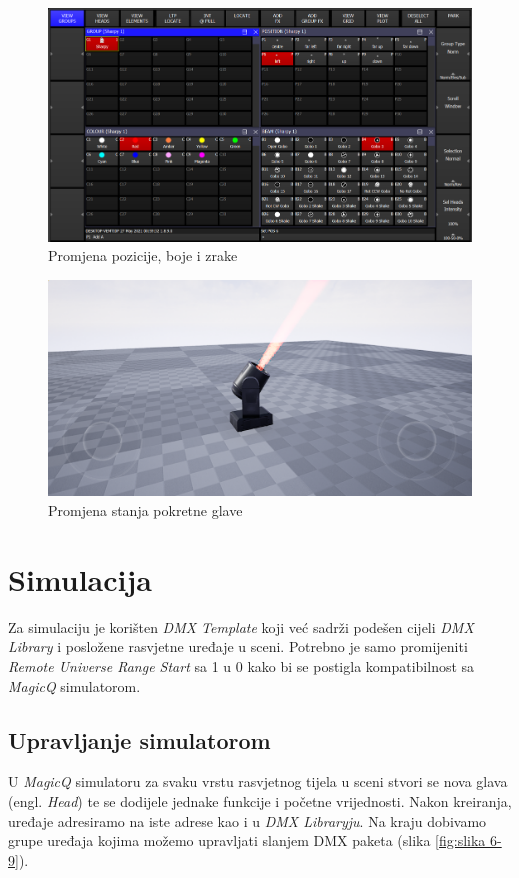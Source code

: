 \documentclass[times, utf8, zavrsni, numeric]{fer}
\begin{document}
\begin{figure}[htp]
	\centering
	\includegraphics[width=\linewidth]{slika 6-7.png}
	\caption{Promjena pozicije, boje i zrake}
	\label{fig:slika 6-7}
\end{figure}

\begin{figure}[htp]
	\centering
	\includegraphics[width=\linewidth]{slika 6-8.png}
	\caption{Promjena stanja pokretne glave}
	\label{fig:slika 6-8}
\end{figure}

\section{Simulacija}
Za simulaciju je korišten \emph{DMX Template} koji već sadrži podešen cijeli \emph{DMX Library} i posložene rasvjetne uređaje u sceni. Potrebno je samo promijeniti \emph{Remote Universe Range Start} sa 1 u 0 kako bi se postigla kompatibilnost sa \emph{MagicQ} simulatorom.

\subsection{Upravljanje simulatorom}
U \emph{MagicQ} simulatoru za svaku vrstu rasvjetnog tijela u sceni stvori se nova glava (engl. \emph{Head}) te se dodijele jednake funkcije i početne vrijednosti. Nakon kreiranja, uređaje adresiramo na iste adrese kao i u \emph{DMX Libraryju}. Na kraju dobivamo grupe uređaja kojima možemo upravljati slanjem DMX paketa (slika \ref{fig:slika 6-9}).
\end{document}
